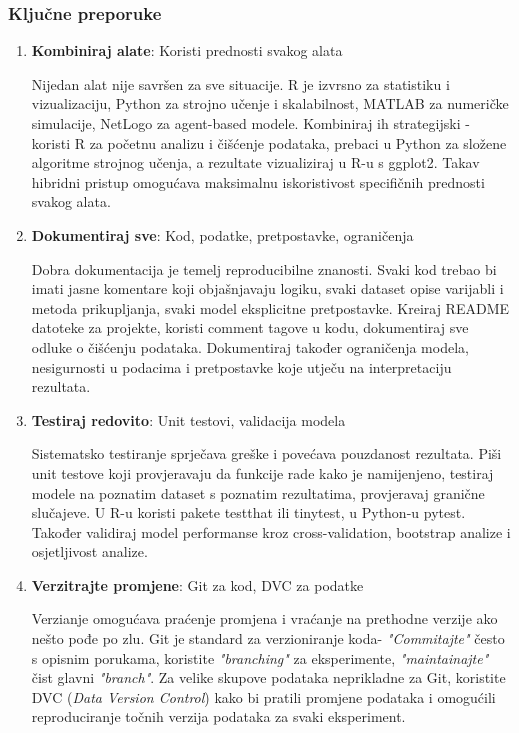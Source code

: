 \documentclass[11pt,oneside]{book}
\begin{document}
\subsubsection{Ključne preporuke}

\begin{enumerate}
	\item \textbf{Kombiniraj alate}: Koristi prednosti svakog alata
	
	Nijedan alat nije savršen za sve situacije. R je izvrsno za statistiku i vizualizaciju, Python za strojno učenje i skalabilnost, MATLAB za numeričke simulacije, NetLogo za agent-based modele. Kombiniraj ih strategijski - koristi R za početnu analizu i čišćenje podataka, prebaci u Python za složene algoritme strojnog učenja, a rezultate vizualiziraj u R-u s ggplot2. Takav hibridni pristup omogućava maksimalnu iskoristivost specifičnih prednosti svakog alata.
	
	\item \textbf{Dokumentiraj sve}: Kod, podatke, pretpostavke, ograničenja
	
	Dobra dokumentacija je temelj reproducibilne znanosti. Svaki kod trebao bi imati jasne komentare koji objašnjavaju logiku, svaki dataset opise varijabli i metoda prikupljanja, svaki model eksplicitne pretpostavke. Kreiraj README datoteke za projekte, koristi comment tagove u kodu, dokumentiraj sve odluke o čišćenju podataka. Dokumentiraj također ograničenja modela, nesigurnosti u podacima i pretpostavke koje utječu na interpretaciju rezultata.
	
	\item \textbf{Testiraj redovito}: Unit testovi, validacija modela
	
	Sistematsko testiranje sprječava greške i povećava pouzdanost rezultata. Piši unit testove koji provjeravaju da funkcije rade kako je namijenjeno, testiraj modele na poznatim dataset s poznatim rezultatima, provjeravaj granične slučajeve. U R-u koristi pakete testthat ili tinytest, u Python-u pytest. Također validiraj model performanse kroz cross-validation, bootstrap analize i osjetljivost analize.
	
	\item \textbf{Verzitrajte promjene}: Git za kod, DVC za podatke
	
	Verzianje omogućava praćenje promjena i vraćanje na prethodne verzije ako nešto pođe po zlu. Git je standard za verzioniranje koda- \textit{"Commitajte"} često s opisnim porukama, koristite \textit{"branching"} za eksperimente, \textit{"maintainajte"} čist glavni \textit{"branch"}. Za velike skupove podataka neprikladne za Git, koristite DVC (\textit{Data Version Control}) kako bi pratili promjene podataka i omogućili reproduciranje točnih verzija podataka za svaki eksperiment.
	

\end{enumerate}
\end{document}
